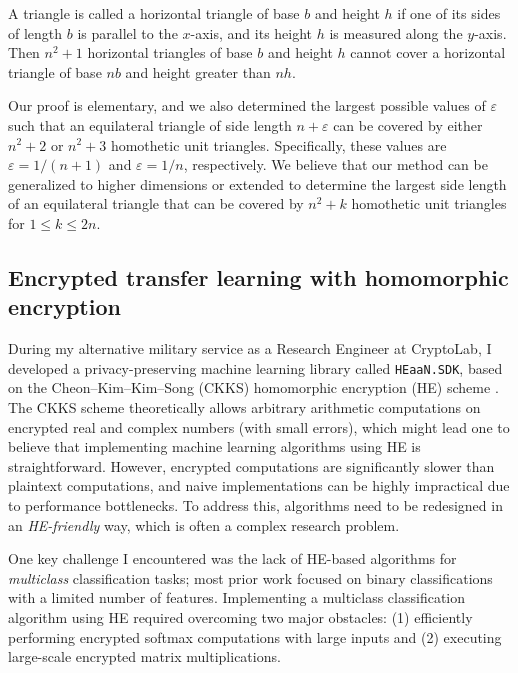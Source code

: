 \documentclass[letterpaper, 10pt]{article}
\begin{document}
\begin{theorem*}[Baek--L.] A triangle is called a horizontal triangle of base $b$ and height $h$ if one of its sides of length $b$ is parallel to the $x$-axis, and its height $h$ is measured along the $y$-axis. Then $n^2 + 1$ horizontal triangles of base $b$ and height $h$ cannot cover a horizontal triangle of base $nb$ and height greater than $nh$. \end{theorem*}

Our proof is elementary, and we also determined the largest possible values of $\varepsilon$ such that an equilateral triangle of side length $n + \varepsilon$ can be covered by either $n^2 + 2$ or $n^2 + 3$  homothetic unit triangles.
Specifically, these values are $\varepsilon= 1 / (n + 1)$ and $\varepsilon = 1 / n$, respectively.
We believe that our method can be generalized to higher dimensions or extended to determine the largest side length of an equilateral triangle that can be covered by $n^2 + k$ homothetic unit triangles for $1 \le k \le 2n$.


\subsection{Encrypted transfer learning with homomorphic encryption}

During my alternative military service as a Research Engineer at CryptoLab, I developed a privacy-preserving machine learning library called \texttt{HEaaN.SDK}, based on the Cheon--Kim--Kim--Song (CKKS) homomorphic encryption (HE) scheme \cite{cheon2017homomorphic}.
The CKKS scheme theoretically allows arbitrary arithmetic computations on encrypted real and complex numbers (with small errors), which might lead one to believe that implementing machine learning algorithms using HE is straightforward.
However, encrypted computations are significantly slower than plaintext computations, and naive implementations can be highly impractical due to performance bottlenecks.
To address this, algorithms need to be redesigned in an \emph{HE-friendly} way, which is often a complex research problem.

One key challenge I encountered was the lack of HE-based algorithms for \emph{multiclass} classification tasks; most prior work focused on binary classifications with a limited number of features.
Implementing a multiclass classification algorithm using HE required overcoming two major obstacles: (1) efficiently performing encrypted softmax computations with large inputs and (2) executing large-scale encrypted matrix multiplications.
\end{document}
